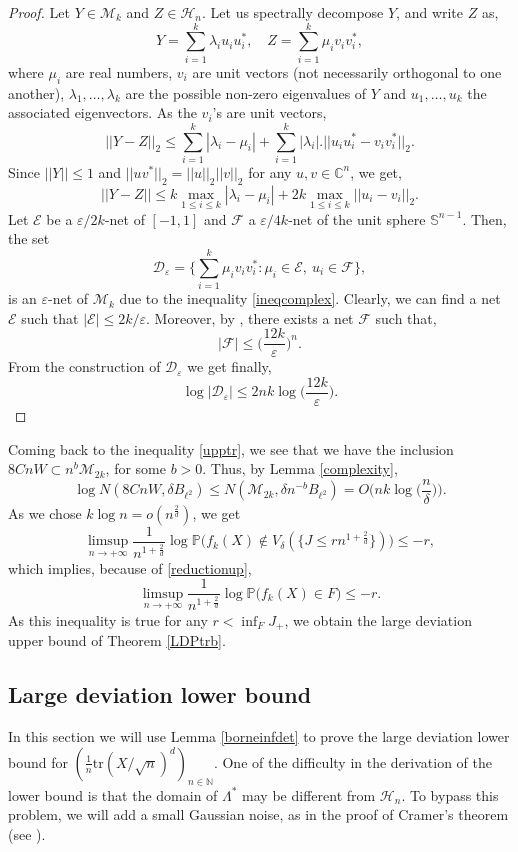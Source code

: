 \documentclass[aop,preprint]{imsart}
\newcommand\NN{\mathbb{N}}
\newcommand\CC{\mathbb{C}}
\newcommand\PP{\mathbb{P}}
\newcommand\tr{\mathrm{tr}}
\newcommand\eps{\varepsilon}
\numberwithin{equation}{section}
\theoremstyle{definition}
\theoremstyle{plain}
\theoremstyle{remark}
\begin{document}
\begin{proof}
Let $Y \in \mathcal{M}_k$ and $Z \in \mathcal{H}_n$. Let us spectrally decompose $Y$, and write $Z$ as,
$$ Y = \sum_{i=1}^k \lambda_i u_i u_i^*,\quad Z = \sum_{i=1}^k \mu_i v_i v_i^*,$$
where $\mu_i$ are real numbers, $v_i$ are unit vectors (not necessarily orthogonal to one another),  $\lambda_1,\ldots,\lambda_k$ are the possible non-zero eigenvalues of $Y$ and $u_1,\ldots,u_k$ the associated eigenvectors. As the $v_i$'s are unit vectors,
$$||Y-Z||_2 \leq \sum_{i=1}^k |\lambda_i- \mu_i| + \sum_{i=1}^k |\lambda_i|. || u_i u_i^* - v_iv_i^*||_2.$$
Since $||Y|| \leq 1$ and $|| uv^*||_2 =||u||_2 ||v||_2$ for any $u,v \in \CC^n$, we get,
\begin{equation}\label{ineqcomplex}  ||Y-Z|| \leq k\max_{1\leq i \leq k} |\lambda_i - \mu_i| + 2k \max_{1\leq i \leq k} || u_i -v_i||_2.\end{equation}
Let $\mathcal{E}$ be a $\eps/2k$-net of $[-1,1]$ and $\mathcal{F}$ a $\eps/4k$-net of the unit sphere $\mathbb{S}^{n-1}$. Then, the set
$$ \mathcal{D}_{\eps} = \big\{ \sum_{i=1}^k \mu_i v_i v_i^* : \mu_i \in \mathcal{E}, \ u_i \in\mathcal{F} \big\},$$
is an $\eps$-net of $\mathcal{M}_k$ due to the inequality \eqref{ineqcomplex}. Clearly, we can find a net $\mathcal{E}$ such that $|\mathcal{E}| \leq 2k/\eps$. Moreover, by \cite[Lemma 1.4.2]{Lamabook}, there exists a net $\mathcal{F}$ such that,
$$ |\mathcal{F}| \leq \Big( \frac{12 k }{\eps}\Big)^n.$$
From the construction of $\mathcal{D}_{\eps}$ we get finally, 
\[\log |\mathcal{D}_{\eps}| \leq 2 nk \log \Big( \frac{12 k}{\eps} \Big).\]
\end{proof}
Coming back to the inequality \eqref{upptr}, we see that we have the inclusion $8CnW \subset  n^{b} \mathcal{M}_{2k}$, for some $b>0$. Thus, by Lemma \ref{complexity}, 
$$ \log N(8C n W, \delta B_{\ell^2}) \leq N( \mathcal{M}_{2k}, \delta n^{-b} B_{\ell^2}) =O\Big(nk \log \Big( \frac{n}{\delta}\Big)\Big).$$
As we chose $k\log n=o(n^{\frac{2}{d}})$, we get
$$\limsup_{n\to +\infty} \frac{1}{n^{1+\frac{2}{d}}} \log\PP\big( f_k(X) \notin V_{\delta}( \{ J \leq rn^{1+\frac{2}{d}} \}) \big) \leq  - r,$$
which implies, because of \eqref{reductionup},
$$\limsup_{n\to +\infty} \frac{1}{n^{1+\frac{2}{d}}} \log\PP\big( f_k(X) \in F\big) \leq -r.$$
As this inequality is true for any $r<\inf_F J_+$, we obtain the large deviation upper bound of Theorem \ref{LDPtrb}.


\subsection{Large deviation lower bound}
In this section we will use Lemma \ref{borneinfdet} to prove the large deviation lower bound for $(\frac{1}{n} \tr(X/\sqrt{n})^d)_{n\in\NN}$. One of the difficulty in the derivation of the lower bound is that the domain of $\Lambda^*$ may be different from $\mathcal{H}_n$. To bypass this problem, we will add a small Gaussian noise, as in the proof of Cramer's theorem (see \cite[Proof of Theorem 2.2.30]{DZ}). 
\end{document}
